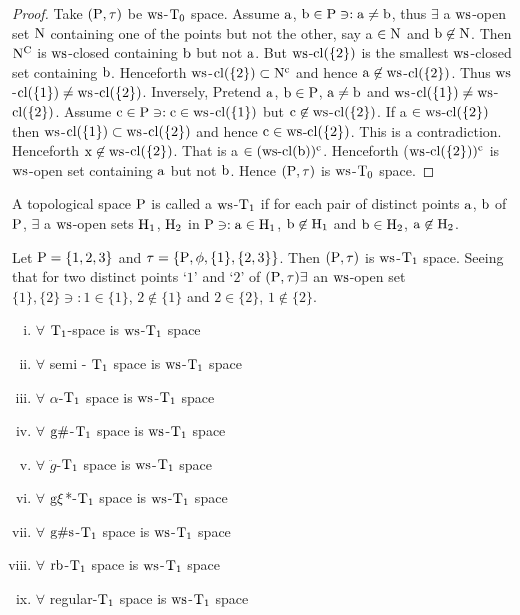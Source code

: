 \begin{proof}
Take $(\mathrm{P}, \tau)$ be $\mathrm{ws}$-$\mathrm{T}_{0}$ space. Assume $\mathrm{a}$, $\mathrm{b} \in \mathrm{P} \ni:\mathrm{a} \neq \mathrm{b}$, thus $\exists$ a $\mathrm{ws}$-open set $\mathrm{N}$ containing one of the points but not the other, say a $\in \mathrm{N}$ and $\mathrm{b} \not\in \mathrm{N}$. Then $\mathrm{N}^{\text{C}}$ is $\mathrm{ws}$-closed containing $\mathrm{b}$ but not $\mathrm{a}$. But $\mathrm{ws}$-$\mathrm{cl}(\{2\})$ is the smallest $\mathrm{ws}$-closed set containing $\mathrm{b}$. Henceforth $\mathrm{ws}$-$\mathrm{cl}(\{2\}) \subset \mathrm{N}^{\text{c}}$ and hence $\mathrm{a}\not\in \mathrm{ws}$-$\mathrm{cl}(\{2\})$. Thus $\mathrm{ws}$-$\mathrm{cl}(\{1\}) \neq \mathrm{ws}$-$\mathrm{cl}(\{2\})$. Inversely, Pretend $\mathrm{a}$, $\mathrm{b} \in \mathrm{P}$, $\mathrm{a}\neq \mathrm{b}$ and $\mathrm{ws}$-$\mathrm{cl}(\{1\}) \neq \mathrm{ws}$-$\mathrm{cl}(\{2\})$. Assume $\mathrm{c}\in \mathrm{P} \ni: \mathrm{c}\in \mathrm{ws}$-$\mathrm{cl}(\{1\})$ but $\mathrm{c} \not\in \mathrm{ws}$-$\mathrm{cl}(\{2\})$. If a $\in \mathrm{ws}$-$\mathrm{cl}(\{2\})$ then $\mathrm{ws}$-$\mathrm{cl}(\{1\}) \subset \mathrm{ws}$-$\mathrm{cl}(\{2\})$ and hence $\mathrm{c} \in \mathrm{ws}$-$\mathrm{cl}(\{2\})$. This is a contradiction. Henceforth $\mathrm{x}\not\in \mathrm{ws}$-$\mathrm{cl}(\{2\})$. That is a $\in (\mathrm{ws}\text{-}\mathrm{cl}(\mathrm{b}))^{\text{c}}$. Henceforth ($\mathrm{ws}$-$\mathrm{cl}(\{2\}))^{\text{c}}$ is $\mathrm{ws}$-open set containing $\mathrm{a}$ but not $\mathrm{b}$. Hence $(\mathrm{P}, \tau)$ is $\mathrm{ws}$-$\mathrm{T}_{0}$ space.
\end{proof}

\begin{dfn}\label{defi8.2.7}
A topological space $\mathrm{P}$ is called a $\mathrm{ws}$-$\mathrm{T}_{1}$ if for each pair of distinct points $\mathrm{a}$, $\mathrm{b}$ of $\mathrm{P}$, $\exists$ a $\mathrm{ws}$-open sets $\mathrm{H}_{1}$, $\mathrm{H}_{2}$ in $\mathrm{P} \ni: \mathrm{a} \in \mathrm{H}_{1}$, $\mathrm{b} \not\in \mathrm{H}_{1}$ and $\mathrm{b} \in \mathrm{H}_{2}$, $\mathrm{a} \not\in \mathrm{H}_{2}$.
\end{dfn}

\begin{exm}\label{exam8.2.8}
Let $\mathrm{P}= \{1, 2, 3\}$ and $\tau =\{\mathrm{P}, \phi, \{1\}, \{2, 3\}\}$. Then $(\mathrm{P}, \tau)$ is $\mathrm{ws}$-$\mathrm{T}_{1}$ space. Seeing that for two distinct points `$1$' and `$2$' of $(\mathrm{P}, \tau) \exists$ an $\mathrm{ws}$-open set $\{1\}, \{2\} \ni: 1 \in \{1\}$, $2 \not\in \{1\}$ and $2 \in \{2\}$, $1 \not\in \{2\}$.
\end{exm}

\begin{thm}\label{thm8.2.9}
\begin{enumerate}[(i)]
\item $\forall$ $\mathrm{T}_{1}$-space is $\mathrm{ws}$-$\mathrm{T}_{1}$ space
\item $\forall$ semi - $\mathrm{T}_{1}$ space is $\mathrm{ws}$-$\mathrm{T}_{1}$ space
\item $\forall$ $\alpha$-$\mathrm{T}_{1}$ space is $\mathrm{ws}$-$\mathrm{T}_{1}$ space
\item $\forall$ $\mathrm{g}\#$-$\mathrm{T}_{1}$ space is $\mathrm{ws}$-$\mathrm{T}_{1}$ space
\item $\forall$ $\ddot{g}$-$\mathrm{T}_{1}$ space is $\mathrm{ws}$-$\mathrm{T}_{1}$ space
\item $\forall$ $\mathrm{g}\xi$*-$\mathrm{T}_{1}$ space is $\mathrm{ws}$-$\mathrm{T}_{1}$ space
\item $\forall$ $\mathrm{g}\#\mathrm{s}$-$\mathrm{T}_{1}$ space is $\mathrm{ws}$-$\mathrm{T}_{1}$ space
\item $\forall$ $\mathrm{rb}$-$\mathrm{T}_{1}$ space is $\mathrm{ws}$-$\mathrm{T}_{1}$ space
\item $\forall$ regular-$\mathrm{T}_{1}$ space is $\mathrm{ws}$-$\mathrm{T}_{1}$ space
\end{enumerate}
\end{thm}

